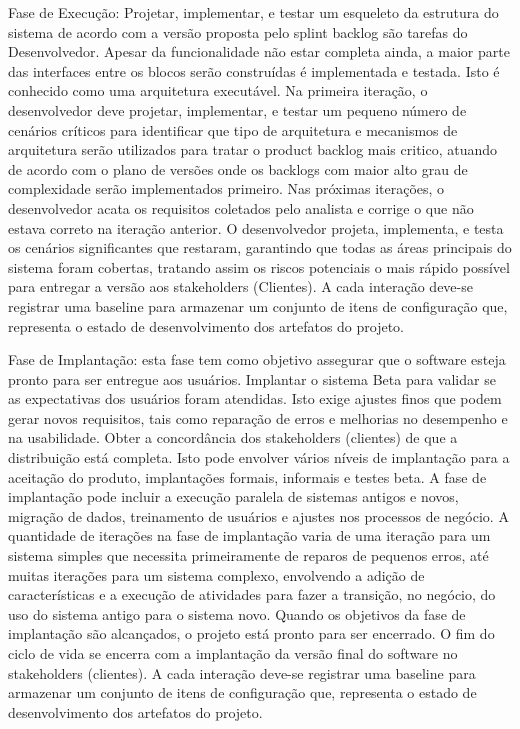 \documentclass[	DIV=calc,%
							paper=a4,%
							fontsize=12pt,%
							onecolumn]{scrartcl}	 					%
\begin{document}
Fase de Execução: Projetar, implementar, e testar um esqueleto da estrutura do sistema de acordo com a versão proposta pelo splint backlog são tarefas do Desenvolvedor. Apesar da funcionalidade não estar completa ainda, a maior parte das interfaces entre os blocos serão construídas é implementada e testada. Isto é conhecido como uma arquitetura executável. Na primeira iteração, o desenvolvedor deve projetar, implementar, e testar um pequeno número de cenários críticos para identificar que tipo de arquitetura e mecanismos de arquitetura serão utilizados para tratar o product backlog mais critico, atuando de acordo com o plano de versões onde os backlogs com maior alto grau de complexidade serão implementados primeiro. 
Nas próximas iterações, o desenvolvedor acata os requisitos coletados pelo analista e corrige o que não estava correto na iteração anterior. O desenvolvedor projeta, implementa, e testa os cenários significantes que restaram, garantindo que todas as áreas principais do sistema foram cobertas, tratando assim os riscos potenciais o mais rápido possível para entregar a versão aos stakeholders (Clientes). A cada interação deve-se registrar uma baseline para armazenar um conjunto de itens de configuração que, representa o estado de desenvolvimento dos artefatos do projeto.


Fase de Implantação: esta fase tem como objetivo assegurar que o software esteja pronto para ser entregue aos usuários.
Implantar o sistema Beta para validar se as expectativas dos usuários foram atendidas. Isto exige ajustes finos que podem gerar novos requisitos, tais como reparação de erros e melhorias no desempenho e na usabilidade. Obter a concordância dos stakeholders (clientes) de que a distribuição está completa. Isto pode envolver vários níveis de implantação para a aceitação do produto, implantações formais, informais e testes beta. 
A fase de implantação pode incluir a execução paralela de sistemas antigos e novos, migração de dados, treinamento de usuários e ajustes nos processos de negócio. A quantidade de iterações na fase de implantação varia de uma iteração para um sistema simples que necessita primeiramente de reparos de pequenos erros, até muitas iterações para um sistema complexo, envolvendo a adição de características e a execução de atividades para fazer a transição, no negócio, do uso do sistema antigo para o sistema novo. Quando os objetivos da fase de implantação são alcançados, o projeto está pronto para ser encerrado. O fim do ciclo de vida se encerra com a implantação da versão final do software no stakeholders (clientes). A cada interação deve-se registrar uma baseline para armazenar um conjunto de itens de configuração que, representa o estado de desenvolvimento dos artefatos do projeto.
\end{document}
